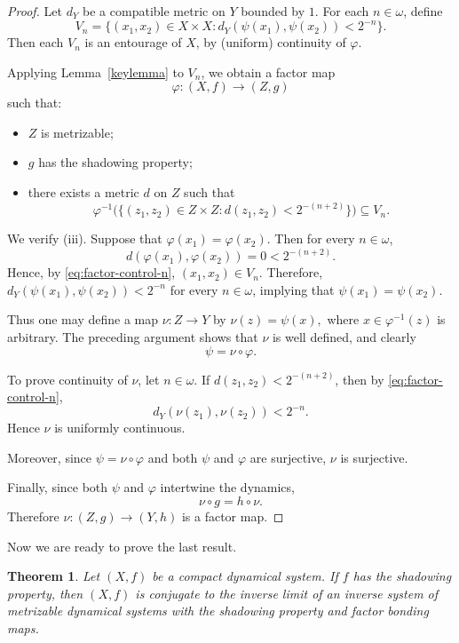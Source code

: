 \documentclass[12pt]{amsart}
\newtheorem{theorem}{Theorem}[section]
\theoremstyle{definition}
\numberwithin{equation}{section}
\theoremstyle{remark}
\begin{document}
\begin{proof}
Let $d_Y$ be a compatible metric on $Y$ bounded by $1$. 
For each $n\in \omega$, define
\[
V_n=\{(x_1,x_2)\in X\times X:
d_Y(\psi(x_1),\psi(x_2))<2^{-n}\}.
\]
Then each $V_n$ is an entourage of $X$, by (uniform) continuity of $\varphi$.

Applying Lemma~\ref{keylemma} to $V_n$, we obtain a factor map
\[
\varphi:(X,f)\to (Z,g)
\]
such that:
\begin{itemize}
\item $Z$ is metrizable;
\item $g$ has the shadowing property;
\item there exists a metric $d$ on $Z$ such that
\begin{equation}\label{eq:factor-control-n}
\varphi^{-1}\bigl(\{(z_1,z_2)\in Z\times Z:
d(z_1,z_2)<2^{-(n+2)}\}\bigr)
\subseteq V_n.
\end{equation}
\end{itemize}

We verify (iii). 
Suppose that $\varphi(x_1)=\varphi(x_2)$. 
Then for every $n\in \omega$,
\[
d(\varphi(x_1),\varphi(x_2))=0<2^{-(n+2)}.
\]
Hence, by \eqref{eq:factor-control-n},
$
(x_1,x_2)\in V_n.
$
Therefore,
$
d_Y(\psi(x_1),\psi(x_2))<2^{-n}
$
for every $n\in \omega$, implying that
$
\psi(x_1)=\psi(x_2).
$

Thus one may define a map $\nu:Z\to Y$ by
$
\nu(z)=\psi(x),
$
where $x\in \varphi^{-1}(z)$ is arbitrary. 
The preceding argument shows that $\nu$ is well defined, and clearly
\[
\psi=\nu\circ \varphi.
\]

To prove continuity of $\nu$, let $n\in \omega$. 
If $d(z_1,z_2)<2^{-(n+2)}$, then by \eqref{eq:factor-control-n},
\[
d_Y(\nu(z_1),\nu(z_2))<2^{-n}.
\]
Hence $\nu$ is uniformly continuous.

Moreover, since
$
\psi=\nu\circ\varphi
$
and both $\psi$ and $\varphi$ are surjective, $\nu$ is surjective.

Finally, since both $\psi$ and $\varphi$ intertwine the dynamics,
\[
\nu\circ g=h\circ \nu.
\]
Therefore $\nu:(Z,g)\to (Y,h)$ is a factor map.
\end{proof}






Now we are ready to prove the last result.
\begin{theorem}\label{ThC}
Let $(X,f)$ be a compact dynamical system. 
If $f$ has the shadowing property, then $(X,f)$ is conjugate to the inverse limit of an inverse system of metrizable dynamical systems with the shadowing property and factor bonding maps.
\end{theorem}
\end{document}
